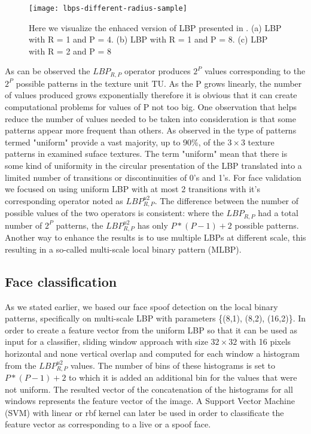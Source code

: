 \begin{figure}[h]
	\begin{center}
		\texttt{[image: lbps-different-radius-sample]}
		\caption[Enhanced LBP visualisation]{Here we visualize the enhaced version of LBP presented in \cite{OjalaPM02}. (a) LBP with R = 1 and P = 4. (b) LBP with R = 1 and P = 8. (c) LBP with R = 2 and P = 8}
	\end{center}
\end{figure}
As can be observed the $LBP_{R,P}$ operator produces $2^P$ values corresponding to the $2^P$ possible patterns in the texture unit TU. As the P grows linearly, the number of values produced grows exponentially therefore it is obvious that it can create computational problems for values of P not too big. 
One observation that helps reduce the number of values needed to be taken into consideration is that some patterns appear more frequent than others. As observed in \cite{OjalaPM02} the type of patterns termed "uniform" provide a vast majority, up to 90\%, of the $3\times3$ texture patterns in examined suface textures. The term "uniform" mean that there is some kind of uniformity in the circular presentation of the LBP translated into a limited number of transitions or discontinuities of 0's and 1's. For face validation we focused on using uniform LBP with at most 2 transitions with it's corresponding operator noted as $LBP_{R,P}^{u2}$. The difference between the number of possible values of the two operators is consistent: where the $LBP_{R,P}$ had a total number of $2^P$ patterns, the $LBP_{R,P}^{u2}$ has only $P*(P-1)+2$ possible patterns.
Another way to enhance the results is to use multiple LBPs at different scale, this resulting in a so-called multi-scale local binary pattern (MLBP).

\subsection{Face classification}
As we stated earlier, we based our face spoof detection on the local binary patterns, specifically on multi-scale LBP with parameters \{(8,1), (8,2), (16,2)\}. In order to create a feature vector from the uniform LBP so that it can be used as input for a classifier, sliding window approach with size $32\times32$ with 16 pixels horizontal and none vertical overlap and computed for each window a histogram from the $LBP_{R,P}^{u2}$ values. The number of bins of these histograms is set to $P*(P-1) + 2$ to which it is added an additional bin for the values that were not uniform. The resulted vector of the concatenation of the histograms for all windows represents the feature vector of the image. A Support Vector Machine (SVM) with linear or rbf kernel can later be used in order to classificate the feature vector as corresponding to a live or a spoof face.

